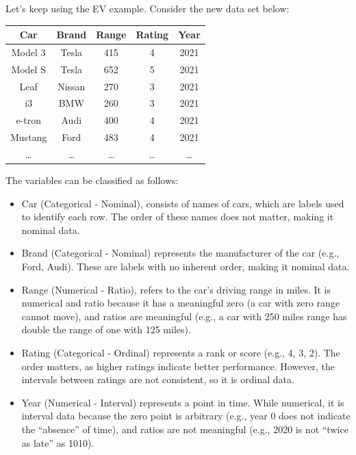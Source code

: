 \documentclass[
  11pt,
  letterpaper,
  DIV=11,
  numbers=noendperiod,
  oneside,
  open=any]{scrreprt}
\begin{document}
\begin{bsexample}[Example]

Let's keep using the EV example. Consider the new data set below:

\begin{center}
\begin{tabular}{ccccc}
\toprule
Car & Brand & Range & Rating & Year \\
\midrule
Model 3 & Tesla & 415 & 4 & 2021 \\
Model S & Tesla & 652 & 5 & 2021 \\
Leaf & Nissan & 270 & 3 & 2021 \\
i3 & BMW & 260 & 3 & 2021 \\
e-tron & Audi & 400 & 4 & 2021 \\
Mustang & Ford & 483 & 4 & 2021 \\
\ldots{} & \ldots{} & \ldots{} & \ldots{} & \ldots{} \\
\bottomrule
\end{tabular}
\end{center}

The variables can be classified as follows:

\begin{itemize}
\item
  Car (Categorical - Nominal), consists of names of cars, which are
  labels used to identify each row. The order of these names does not
  matter, making it nominal data.
\item
  Brand (Categorical - Nominal) represents the manufacturer of the car
  (e.g., Ford, Audi). These are labels with no inherent order, making it
  nominal data.
\item
  Range (Numerical - Ratio), refers to the car's driving range in miles.
  It is numerical and ratio because it has a meaningful zero (a car with
  zero range cannot move), and ratios are meaningful (e.g., a car with
  250 miles range has double the range of one with 125 miles).
\item
  Rating (Categorical - Ordinal) represents a rank or score (e.g., 4, 3,
  2). The order matters, as higher ratings indicate better performance.
  However, the intervals between ratings are not consistent, so it is
  ordinal data.
\item
  Year (Numerical - Interval) represents a point in time. While
  numerical, it is interval data because the zero point is arbitrary
  (e.g., year 0 does not indicate the ``absence'' of time), and ratios
  are not meaningful (e.g., 2020 is not ``twice as late'' as 1010).
\end{itemize}

\end{bsexample}
\end{document}
